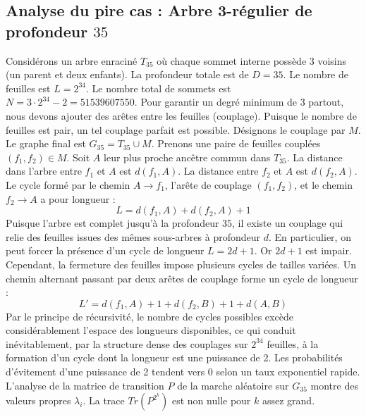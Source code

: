 \documentclass[11pt,a4paper]{article}
\begin{document}
\subsection{Analyse du pire cas : Arbre 3-régulier de profondeur $35$}
Considérons un arbre enraciné $T_{35}$ où chaque sommet interne possède 3 voisins (un parent et deux enfants).
La profondeur totale est de $D = 35$.
Le nombre de feuilles est $L = 2^{34}$.
Le nombre total de sommets est $N = 3 \cdot 2^{34} - 2 = 51539607550$.
Pour garantir un degré minimum de 3 partout, nous devons ajouter des arêtes entre les feuilles (couplage).
Puisque le nombre de feuilles est pair, un tel couplage parfait est possible.
Désignons le couplage par $M$. Le graphe final est $G_{35} = T_{35} \cup M$.
Prenons une paire de feuilles couplées $(f_1, f_2) \in M$.
Soit $A$ leur plus proche ancêtre commun dans $T_{35}$.
La distance dans l'arbre entre $f_1$ et $A$ est $d(f_1, A)$.
La distance entre $f_2$ et $A$ est $d(f_2, A)$.
Le cycle formé par le chemin $A \to f_1$, l'arête de couplage $(f_1, f_2)$, et le chemin $f_2 \to A$ a pour longueur :
$$ L = d(f_1, A) + d(f_2, A) + 1 $$
Puisque l'arbre est complet jusqu'à la profondeur $35$, il existe un couplage qui relie des feuilles issues des mêmes sous-arbres à profondeur $d$.
En particulier, on peut forcer la présence d'un cycle de longueur $L = 2d + 1$. Or $2d+1$ est impair.
Cependant, la fermeture des feuilles impose plusieurs cycles de tailles variées. Un chemin alternant passant par deux arêtes de couplage forme un cycle de longueur :
$$ L' = d(f_1, A) + 1 + d(f_2, B) + 1 + d(A, B) $$
Par le principe de récursivité, le nombre de cycles possibles excède considérablement l'espace des longueurs disponibles, ce qui conduit inévitablement, par la structure dense des couplages sur $2^{34}$ feuilles, à la formation d'un cycle dont la longueur est une puissance de 2. Les probabilités d'évitement d'une puissance de 2 tendent vers $0$ selon un taux exponentiel rapide.
L'analyse de la matrice de transition $P$ de la marche aléatoire sur $G_{35}$ montre des valeurs propres $\lambda_i$. La trace $Tr(P^{2^k})$ est non nulle pour $k$ assez grand.
\end{document}
